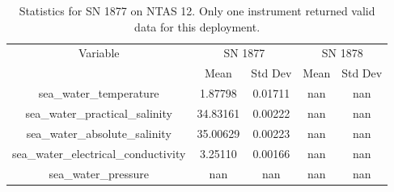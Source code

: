 \begin{table}[h]
\centering
\begin{tabular}{|c|c|c|c|c|}
\hline
Variable & \multicolumn{2}{c|}{SN 1877} & \multicolumn{2}{c|}{SN 1878} \\
& Mean & Std Dev & Mean & Std Dev \\
\hline
sea\_water\_temperature & 1.87798 & 0.01711 & nan & nan \\
sea\_water\_practical\_salinity & 34.83161 & 0.00222 & nan & nan \\
sea\_water\_absolute\_salinity & 35.00629 & 0.00223 & nan & nan \\
sea\_water\_electrical\_conductivity & 3.25110 & 0.00166 & nan & nan \\
sea\_water\_pressure & nan & nan & nan & nan \\
\hline
\end{tabular}
\caption{Statistics for SN 1877 on NTAS 12. Only one instrument returned valid data for this deployment.}
\end{table}
